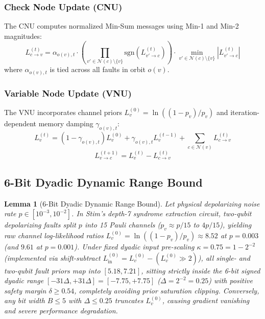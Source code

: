 \documentclass[journal]{IEEEtran}
\newtheorem{lemma}{Lemma}
\begin{document}
\subsubsection{Check Node Update (CNU)}
The CNU computes normalized Min-Sum messages using Min-1 and Min-2 magnitudes:
\begin{equation}
    L_{c \to v}^{(t)} = \alpha_{o(v), t} \cdot \left( \prod_{v' \in \mathcal{N}(c) \setminus \{v\}} \text{sgn}(L_{v' \to c}^{(t)}) \right) \cdot \min_{v' \in \mathcal{N}(c) \setminus \{v\}} |L_{v' \to c}^{(t)}|
\end{equation}
where $\alpha_{o(v), t}$ is tied across all faults in orbit $o(v)$.

\subsubsection{Variable Node Update (VNU)}
The VNU incorporates channel priors $L_v^{(0)} = \ln((1-p_v)/p_v)$ and iteration-dependent memory damping $\gamma_{o(v), t}$:
\begin{equation}
    L_v^{(t)} = (1 - \gamma_{o(v), t}) L_v^{(0)} + \gamma_{o(v), t} L_v^{(t-1)} + \sum_{c \in \mathcal{N}(v)} L_{c \to v}^{(t)}
\end{equation}
\begin{equation}
    L_{v \to c}^{(t+1)} = L_v^{(t)} - L_{c \to v}^{(t)}
\end{equation}

\subsection{6-Bit Dyadic Dynamic Range Bound}
\begin{lemma}[6-Bit Dyadic Dynamic Range Bound]
Let physical depolarizing noise rate $p \in [10^{-3}, 10^{-2}]$. In Stim's depth-7 syndrome extraction circuit, two-qubit depolarizing faults split $p$ into 15 Pauli channels ($p_v \approx p/15$ to $4p/15$), yielding raw channel log-likelihood ratios $L_v^{(0)} = \ln((1-p_v)/p_v) \approx 8.52$ at $p = 0.003$ (and $9.61$ at $p = 0.001$). Under fixed dyadic input pre-scaling $\kappa = 0.75 = 1 - 2^{-2}$ (implemented via shift-subtract $L_{\text{in}}^{(0)} = L_v^{(0)} - (L_v^{(0)} \gg 2)$), all single- and two-qubit fault priors map into $[5.18, 7.21]$, sitting strictly inside the 6-bit signed dyadic range $[-31\Delta, +31\Delta] = [-7.75, +7.75]$ ($\Delta = 2^{-2} = 0.25$) with positive safety margin $\delta \ge 0.54$, completely avoiding prior saturation clipping. Conversely, any bit width $B \le 5$ with $\Delta \le 0.25$ truncates $L_v^{(0)}$, causing gradient vanishing and severe performance degradation.
\end{lemma}
\end{document}
